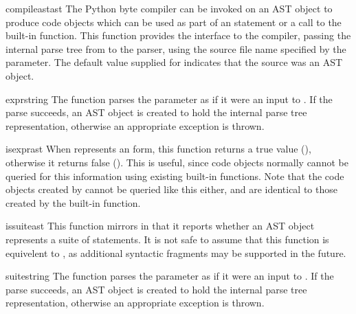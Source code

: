 \begin{funcdesc}{compileast}{ast}
The Python byte compiler can be invoked on an AST object to produce
code objects which can be used as part of an  statement or
a call to the built-in  function.  This function provides
the interface to the compiler, passing the internal parse tree from
 to the parser, using the source file name specified
by the  parameter.  The default value supplied
for  indicates that the source was an AST object.
\end{funcdesc}


\begin{funcdesc}{expr}{string}
The  function parses the parameter 
as if it were an input to .  If
the parse succeeds, an AST object is created to hold the internal
parse tree representation, otherwise an appropriate exception is
thrown.
\end{funcdesc}


\begin{funcdesc}{isexpr}{ast}
When  represents an  form, this function
returns a true value (), otherwise it returns false
().  This is useful, since code objects normally cannot be
queried for this information using existing built-in functions.  Note
that the code objects created by  cannot be queried
like this either, and are identical to those created by the built-in
 function.
\end{funcdesc}


\begin{funcdesc}{issuite}{ast}
This function mirrors  in that it reports whether an
AST object represents a suite of statements.  It is not safe to assume
that this function is equivelent to , as
additional syntactic fragments may be supported in the future.
\end{funcdesc}


\begin{funcdesc}{suite}{string}
The  function parses the parameter 
as if it were an input to .  If
the parse succeeds, an AST object is created to hold the internal
parse tree representation, otherwise an appropriate exception is
thrown.
\end{funcdesc}



